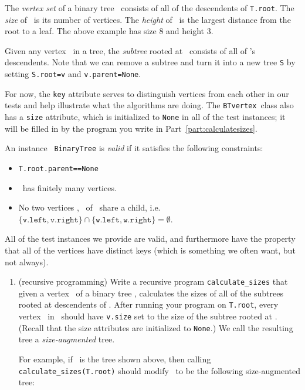 \documentclass[11pt]{article}
\begin{document}
\begin{enumerate}
 The {\em vertex set} of a binary tree \treeT\ consists of all of the descendents of \texttt{T.root}. The {\em size} of \treeT\ is its number of vertices. The {\em height} of \treeT\ is the largest distance from the root to a leaf.  The above example has size 8 and height 3.
 
 Given any vertex \btv\ in a tree, the {\em subtree} rooted at \btv\ consists of all of \btv's descendents.  Note that we can remove a subtree and turn it into a new tree \texttt{S} by setting
 \texttt{S.root=v} and \texttt{v.parent=None}.

 For now, the \texttt{key} attribute serves to distinguish vertices from each other in our tests and help illustrate what the algorithms are doing.  The \texttt{BTvertex}\ class
 also has a \texttt{size} attribute, which is initialized to \texttt{None} in all of the test instances; it will be filled in by the program you write in Part~\ref{part:calculatesizes}.

 An instance \treeT\ \texttt{BinaryTree} is {\em valid} if it satisfies the following constraints: \begin{itemize}
     \item \texttt{T.root.parent==None}
     \item \treeT\ has finitely many vertices.
     \item No two vertices \btv, \btw\ of \treeT\ share a child, i.e. 
     $\{\texttt{v.left},\texttt{v.right}\} \cap \{\texttt{w.left},\texttt{w.right}\} = \emptyset$. 
 \end{itemize}
 All of the test instances we provide are valid, and furthermore have the property that all of the vertices have distinct keys (which is something we often want, but not always).

 \begin{enumerate}
 \item \label{part:calculatesizes} (recursive programming)
 Write a recursive program \texttt{calculate\_sizes} that given a vertex \btv\ of a binary tree \treeT, calculates the sizes of all of the subtrees rooted at descendents of \btv.  After running your program on \texttt{T.root}, every vertex \btv\ in \treeT\ should have \texttt{v.size} set to the size of the subtree rooted at \btv. (Recall that the size attributes are initialized to \texttt{None}.)  We call the resulting tree a {\em size-augmented} tree.
 
For example, if \treeT\  is the  tree shown above, 
then calling \texttt{calculate\_sizes(T.root)} should modify  \treeT\ to be the following size-augmented tree:


\end{enumerate}
\end{enumerate}
\end{document}
